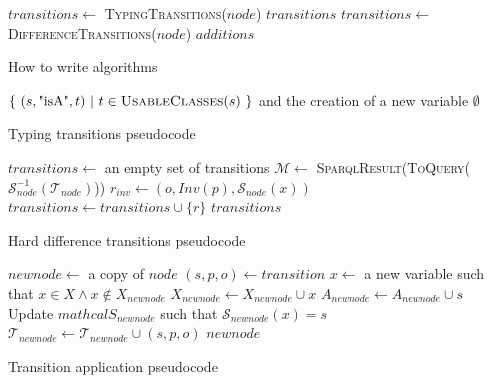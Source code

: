 \documentclass[a4paper,11pt,twoside]{StyleThese}
\begin{document}
\begin{algorithm}[H]
\begin{algorithmic}[1]
\State $transitions\leftarrow$ \textsc{TypingTransitions}($node$)
	\State \Return $transitions$
\EndIf
\State $transitions\leftarrow$ \textsc{DifferenceTransitions}($node$)
\State \Return $additions$
\EndFunction
\end{algorithmic}
 \caption{How to write algorithms}
\end{algorithm}

\begin{algorithm}[H]
\begin{algorithmic}[1]
\State \Return $\{\ (s,\text{"isA"},t)\ |\ t \in \textsc{UsableClasses}(s)\ \} $ and the creation of a new variable 
\EndIf
\EndFor
\State \Return $\emptyset$
\EndFunction
\end{algorithmic}
 \caption{Typing transitions pseudocode}
 \label{alg:typingtrans}
\end{algorithm}

\begin{algorithm}[H]
\begin{algorithmic}[1]
\State $transitions\leftarrow$ an empty set of transitions
\State $\mathcal{M}\leftarrow$ \textsc{SparqlResult}(\textsc{ToQuery}($\mathcal{S}_{node}^{-1}(\mathcal{T}_{node})$))
			 \label{line:harddiff}
				\State $r_{inv} \leftarrow (o, Inv(p), \mathcal{S}_{node}(x))$
					\State $transitions \leftarrow transitions \cup \{r\}$
				\EndIf
			\EndFor
		\EndIf
	\EndFor
\EndFor
\State \Return $transitions$
\EndFunction
\end{algorithmic}
 \caption{Hard difference transitions pseudocode}
 \label{alg:harddifftrans}
\end{algorithm}

\begin{algorithm}[H]
\begin{algorithmic}[1]
\State $newnode \leftarrow$ a copy of $node$
\State $(s, p, o) \leftarrow transition$
	\State $x \leftarrow$ a new variable such that $x \in X \land x \notin X_{newnode}$
	\State $X_{newnode} \leftarrow X_{newnode} \cup x$
	\State $A_{newnode} \leftarrow A_{newnode} \cup s$
	\State Update $mathcal{S}_{newnode}$ such that $\mathcal{S}_{newnode}(x) = s$
\EndIf
\State $\mathcal{T}_{newnode} \leftarrow \mathcal{T}_{newnode} \cup (s, p, o)$
\State \Return $newnode$
\EndFunction
\end{algorithmic}
 \caption{Transition application pseudocode}
 \label{alg:transapply}
\end{algorithm}
\end{document}
